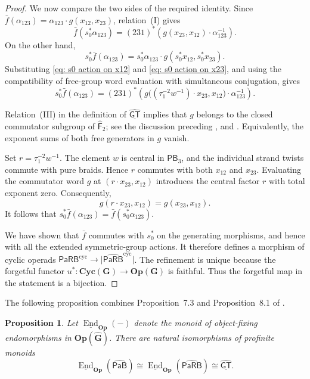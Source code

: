 \documentclass{amsart}
\newcommand{\Grpd}{\mathbf{G}}
\newcommand{\PaRB}{\mathsf{PaRB}}
\newcommand{\PaB}{\mathsf{PaB}}
\newcommand{\Cyc}{\mathbf{Cyc}}
\newcommand{\Op}{\mathbf{Op}}
\newcommand{\End}{\operatorname{End}}
\newcommand{\GT}{\widehat{\mathsf{GT}}}
\newcommand{\PB}{\mathsf{PB}} %
\newcommand{\Free}{\mathsf{F}} %
\newtheorem{prop}[theorem]{Proposition}%
\theoremstyle{definition}
\numberwithin{equation}{section}
\begin{document}
\begin{proof}
We now compare the two sides of the required identity. Since
$\bar f(\alpha_{123})
=\alpha_{123}\cdot g(x_{12},x_{23})$, relation~\textnormal{(I)}
gives
\[
\bar f(s_0^*\alpha_{123})
=
(231)^*\left(
g(x_{23},x_{12})\cdot\alpha_{123}^{-1}
\right).
\]
On the other hand,
\[
s_0^*\bar f(\alpha_{123})
=
s_0^*\alpha_{123}\cdot
g(s_0^*x_{12},s_0^*x_{23}).
\]
Substituting
\eqref{eq: s0 action on x12} and
\eqref{eq: s0 action on x23}, and using the compatibility of
free-group word evaluation with simultaneous conjugation, gives
\[
s_0^*\bar f(\alpha_{123})
=
(231)^*\left(
g\bigl((\tau_1^{-2}w^{-1})\cdot x_{23},x_{12}\bigr)
\cdot\alpha_{123}^{-1}
\right).
\]

Relation~\textnormal{(III)} in the definition of $\underline{\GT}$ implies that $g$ belongs to the closed commutator subgroup of $\widehat{\Free}_2$; see the discussion preceding \cite[Proposition~7.3]{Boavida-Horel-Robertson}, and \cite[Proposition 1.5]{ihara}. Equivalently, the exponent sums of both free generators in $g$ vanish.

Set $r=\tau_1^{-2}w^{-1}$. The element $w$ is central in $\PB_3$,
and the individual strand twists commute with pure braids. Hence
$r$ commutes with both $x_{12}$ and $x_{23}$. Evaluating the
commutator word $g$ at $(r\cdot x_{23},x_{12})$ introduces the
central factor $r$ with total exponent zero. Consequently,
\[
g(r\cdot x_{23},x_{12})
=
g(x_{23},x_{12}).
\]
It follows that
$s_0^*\bar f(\alpha_{123})
=\bar f(s_0^*\alpha_{123})$.

We have shown that $\bar f$ commutes with $s_0^*$ on the generating
morphisms, and hence with all the extended symmetric-group actions.
It therefore defines a morphism of cyclic operads
$\PaRB^{\mathrm{cyc}}\to
\lvert\widehat{\PaRB}^{\mathrm{cyc}}\rvert$.
The refinement is unique because the forgetful functor
$u^*\colon\Cyc(\Grpd)\to\Op(\Grpd)$ is faithful. Thus the
forgetful map in the statement is a bijection.
\end{proof}

The following proposition combines Proposition~7.3 and Proposition~8.1 of 
\cite{Boavida-Horel-Robertson}.

\begin{prop}
\label{End of PaRB is profinite GT}
Let $\underline{\End}_{\Op}(-)$ denote the monoid of object-fixing
endomorphisms in $\Op(\widehat{\Grpd})$. There are natural
isomorphisms of profinite monoids
\[
\underline{\End}_{\Op}(\widehat{\PaB})
\cong
\underline{\End}_{\Op}(\widehat{\PaRB})
\cong
\underline{\GT}.
\]
\end{prop}
\end{document}
